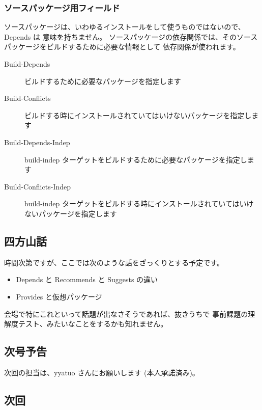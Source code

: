 \documentclass[mingoth,a4paper]{jsarticle}
\begin{document}
\subsubsection{ソースパッケージ用フィールド}

ソースパッケージは、いわゆるインストールをして使うものではないので、Depends は
意味を持ちません。
ソースパッケージの依存関係では、そのソースパッケージをビルドするために必要な情報として
依存関係が使われます。

\begin{description}
\item[Build-Depends] ビルドするために必要なパッケージを指定します
\item[Build-Conflicts] ビルドする時にインストールされていてはいけないパッケージを指定します
\item[Build-Depends-Indep] build-indep ターゲットをビルドするために必要なパッケージを指定します
\item[Build-Conflicts-Indep] build-indep ターゲットをビルドする時にインストールされていてはいけないパッケージを指定します
\end{description}


\subsection{四方山話}

時間次第ですが、ここでは次のような話をざっくりとする予定です。

\begin{itemize}
\item Depends と Recommends と Suggests の違い
\item Provides と仮想パッケージ
\end{itemize}

会場で特にこれといって話題が出なさそうであれば、抜きうちで
事前課題の理解度テスト、みたいなことをするかも知れません。

\subsection{次号予告}

次回の担当は、yyatuo さんにお願いします (本人承諾済み)。

\clearpage
{}

\subsection{次回}
\end{document}
